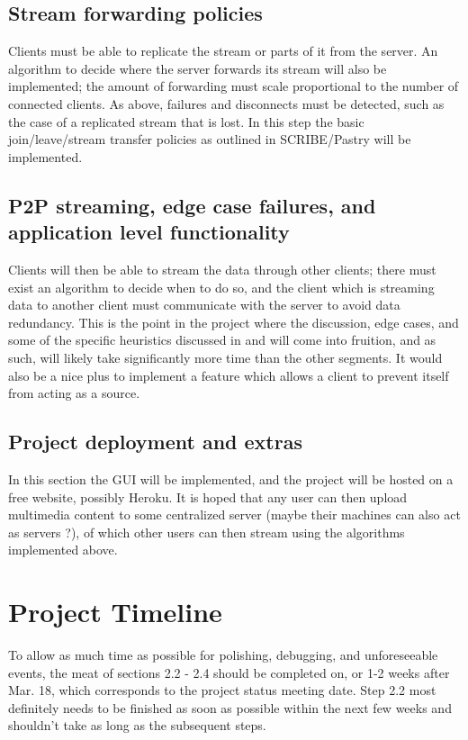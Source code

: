 \documentclass[fleqn,24pt]{SelfArx} %
\begin{document}
\subsection{Stream forwarding policies}
Clients must be able to replicate the stream or parts of it from the server. An algorithm to decide where the server forwards its stream will also be implemented; the amount of forwarding must scale proportional to the number of connected clients. As above, failures and disconnects must be detected, such as the case of a replicated stream that is lost. In this step the basic join/leave/stream transfer policies as outlined in SCRIBE/Pastry will be implemented.

\subsection{P2P streaming, edge case failures, and application level functionality}
Clients will then be able to stream the data through other clients; there must exist an algorithm to decide when to do so, and the client which is streaming data to another client must communicate with the server to avoid data redundancy. This is the point in the project where the discussion, edge cases, and some of the specific heuristics discussed in \cite{1} and \cite{2} will come into fruition, and as such, will likely take significantly more time than the other segments. It would also be a nice plus to implement a feature which allows a client to prevent itself from acting as a source.

\subsection{Project deployment and extras}
In this section the GUI will be implemented, and the project will be hosted on a free website, possibly Heroku. It is hoped that any user can then upload multimedia content to some centralized server (maybe their machines can also act as servers ?), of which other users can then stream using the algorithms implemented above.

\section{Project Timeline}

To allow as much time as possible for polishing, debugging, and unforeseeable events, the meat of sections 2.2 - 2.4 should be completed on, or 1-2 weeks after Mar. 18, which corresponds to the project status meeting date. Step 2.2 most definitely needs to be finished as soon as possible within the next few weeks and shouldn't take as long as the subsequent steps.
\end{document}
